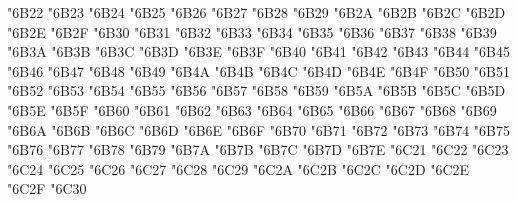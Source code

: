 {\Uchar\jis"6B22 %
\Uchar\jis"6B23 %
\Uchar\jis"6B24 %
\Uchar\jis"6B25 %
\Uchar\jis"6B26 %
\Uchar\jis"6B27 %
\Uchar\jis"6B28 %
\Uchar\jis"6B29 %
\Uchar\jis"6B2A %
\Uchar\jis"6B2B %
\Uchar\jis"6B2C %
\Uchar\jis"6B2D %
\Uchar\jis"6B2E %
\Uchar\jis"6B2F %
\Uchar\jis"6B30 %
\Uchar\jis"6B31 %
\Uchar\jis"6B32 %
\Uchar\jis"6B33 %
\Uchar\jis"6B34 %
\Uchar\jis"6B35 %
\Uchar\jis"6B36 %
\Uchar\jis"6B37 %
\Uchar\jis"6B38 %
\Uchar\jis"6B39 %
\Uchar\jis"6B3A %
\Uchar\jis"6B3B %
\Uchar\jis"6B3C %
\Uchar\jis"6B3D %
\Uchar\jis"6B3E %
\Uchar\jis"6B3F %
\Uchar\jis"6B40 %
\Uchar\jis"6B41 %
\Uchar\jis"6B42 %
\Uchar\jis"6B43 %
\Uchar\jis"6B44 %
\Uchar\jis"6B45 %
\Uchar\jis"6B46 %
\Uchar\jis"6B47 %
\Uchar\jis"6B48 %
\Uchar\jis"6B49 %
\Uchar\jis"6B4A %
\Uchar\jis"6B4B %
\Uchar\jis"6B4C %
\Uchar\jis"6B4D %
\Uchar\jis"6B4E %
\Uchar\jis"6B4F %
\Uchar\jis"6B50 %
\Uchar\jis"6B51 %
\Uchar\jis"6B52 %
\Uchar\jis"6B53 %
\Uchar\jis"6B54 %
\Uchar\jis"6B55 %
\Uchar\jis"6B56 %
\Uchar\jis"6B57 %
\Uchar\jis"6B58 %
\Uchar\jis"6B59 %
\Uchar\jis"6B5A %
\Uchar\jis"6B5B %
\Uchar\jis"6B5C %
\Uchar\jis"6B5D %
\Uchar\jis"6B5E %
\Uchar\jis"6B5F %
\Uchar\jis"6B60 %
\Uchar\jis"6B61 %
\Uchar\jis"6B62 %
\Uchar\jis"6B63 %
\Uchar\jis"6B64 %
\Uchar\jis"6B65 %
\Uchar\jis"6B66 %
\Uchar\jis"6B67 %
\Uchar\jis"6B68 %
\Uchar\jis"6B69 %
\Uchar\jis"6B6A %
\Uchar\jis"6B6B %
\Uchar\jis"6B6C %
\Uchar\jis"6B6D %
\Uchar\jis"6B6E %
\Uchar\jis"6B6F %
\Uchar\jis"6B70 %
\Uchar\jis"6B71 %
\Uchar\jis"6B72 %
\Uchar\jis"6B73 %
\Uchar\jis"6B74 %
\Uchar\jis"6B75 %
\Uchar\jis"6B76 %
\Uchar\jis"6B77 %
\Uchar\jis"6B78 %
\Uchar\jis"6B79 %
\Uchar\jis"6B7A %
\Uchar\jis"6B7B %
\Uchar\jis"6B7C %
\Uchar\jis"6B7D %
\Uchar\jis"6B7E %
\Uchar\jis"6C21 %
\Uchar\jis"6C22 %
\Uchar\jis"6C23 %
\Uchar\jis"6C24 %
\Uchar\jis"6C25 %
\Uchar\jis"6C26 %
\Uchar\jis"6C27 %
\Uchar\jis"6C28 %
\Uchar\jis"6C29 %
\Uchar\jis"6C2A %
\Uchar\jis"6C2B %
\Uchar\jis"6C2C %
\Uchar\jis"6C2D %
\Uchar\jis"6C2E %
\Uchar\jis"6C2F %
\Uchar\jis"6C30 %
}
